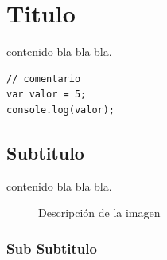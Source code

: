 \section{Titulo}
contenido bla bla bla.

\begin{lstlisting}[style=JavaScriptStyle, caption={Código JavaScript}]
// comentario
var valor = 5;
console.log(valor);
\end{lstlisting}

\subsection{Subtitulo}
contenido bla bla bla.

\begin{figure}[h]
\centering
{}
\caption{Descripción de la imagen}
\end{figure}

\subsubsection{Sub Subtitulo}

\begin{table}[H]
\caption{Descripción de la tabla}
\end{table}
